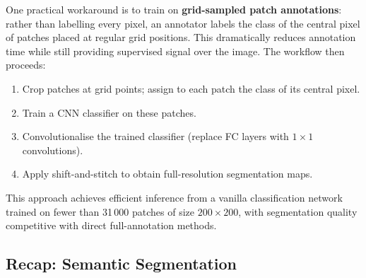 \documentclass[11pt,a4paper]{article}
\begin{document}
One practical workaround is to train on \textbf{grid-sampled patch annotations}: rather than labelling every pixel, an annotator labels the class of the central pixel of patches placed at regular grid positions. This dramatically reduces annotation time while still providing supervised signal over the image. The workflow then proceeds:

\begin{enumerate}
  \item Crop patches at grid points; assign to each patch the class of its central pixel.
  \item Train a CNN classifier on these patches.
  \item Convolutionalise the trained classifier (replace FC layers with $1\times 1$ convolutions).
  \item Apply shift-and-stitch to obtain full-resolution segmentation maps.
\end{enumerate}

This approach achieves efficient inference from a vanilla classification network trained on fewer than 31\,000 patches of size $200\times 200$, with segmentation quality competitive with direct full-annotation methods.

\subsection{Recap: Semantic Segmentation}
\label{sec:recap_semseg}
\end{document}
